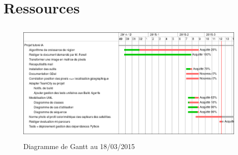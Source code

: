 \documentclass[a4paper, 12pt]{article}
\begin{document}
\appendix
\section{Ressources}
	\begin{figure}[h]
		\begin{center}
			\includegraphics[height=60mm]{gantt.png}
			\newline
			\caption{Diagramme de Gantt au 18/03/2015}
			\label{gantt}
		\end{center}
	\end{figure}
\end{document}
